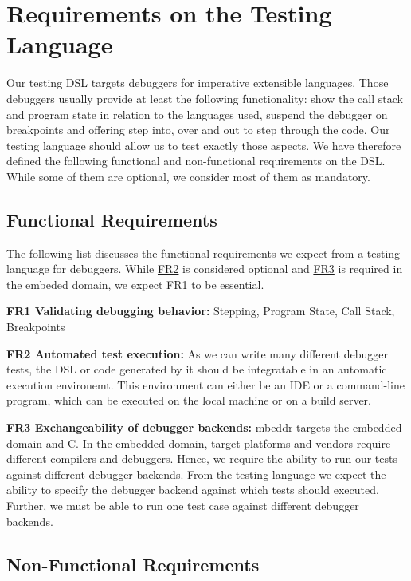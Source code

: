 \section{Requirements on the Testing Language}

Our testing \ac{DSL} targets debuggers for imperative extensible languages.
Those debuggers usually provide at least the following functionality:
show the call stack and program state in relation to the languages used, 
suspend the debugger on breakpoints and offering step into, over and out to step
through the code. Our testing language should allow us to test exactly those
aspects. We have therefore defined the following functional and non-functional
requirements on the \ac{DSL}. While some of them are optional, we consider most
of them as mandatory.

\subsection{Functional Requirements}

The following list discusses the functional requirements we expect from a
testing language for debuggers. While \hyperref[FR2]{FR2} is considered
optional and \hyperref[FR3]{FR3} is required in the embeded domain, we expect
\hyperref[FR1]{FR1} to be essential.
 
\noindent \textbf{\label{FR1}FR1 Validating debugging behavior:} Stepping,
Program State, Call Stack, 	Breakpoints

\noindent \textbf{\label{FR2}FR2 Automated test execution:} As we can write many
different debugger tests, the \ac{DSL} or code generated by it should be
integratable in an automatic execution environemt. This environment can either
be an \ac{IDE} or a command-line program, which can be executed on the local
machine or on a build server.


\noindent \textbf{\label{FR3}FR3 Exchangeability of debugger backends:}
mbeddr targets the embedded domain and C. In the embedded domain, target platforms and
vendors require different compilers and debuggers. 
Hence, we require the ability to run our tests against
different debugger backends. From the testing language we expect the ability to
specify the debugger backend against which tests should executed. Further, we
must be able to run one test case against different debugger backends.

\subsection{Non-Functional Requirements}


